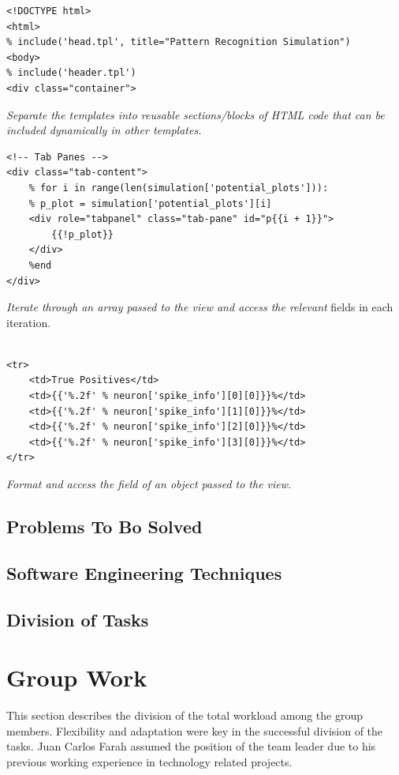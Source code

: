 \documentclass[a4paper,11pt]{article}
\begin{document}
\begin{verbatim}
<!DOCTYPE html>
<html>
% include('head.tpl', title="Pattern Recognition Simulation")
<body>
% include('header.tpl')
<div class="container">
\end{verbatim}
\textit{Separate the templates into reusable sections/blocks of HTML code that can be included dynamically in other templates.}    
\newpage 


\begin{verbatim}
<!-- Tab Panes -->
<div class="tab-content">
    % for i in range(len(simulation['potential_plots'])):
    % p_plot = simulation['potential_plots'][i]
    <div role="tabpanel" class="tab-pane" id="p{{i + 1}}">
        {{!p_plot}}
    </div>
    %end
</div>
\end{verbatim}
\textit{Iterate through an array passed to the view and access the relevant} fields in each iteration.
\\
\\

\begin{verbatim}
<tr>
    <td>True Positives</td>
    <td>{{'%.2f' % neuron['spike_info'][0][0]}}%</td>
    <td>{{'%.2f' % neuron['spike_info'][1][0]}}%</td>
    <td>{{'%.2f' % neuron['spike_info'][2][0]}}%</td>
    <td>{{'%.2f' % neuron['spike_info'][3][0]}}%</td>
</tr>
  \end{verbatim}
\textit{Format and access the field of an object passed to the view.}

\newpage

\subsection{Problems To Bo Solved}

\subsection{Software Engineering Techniques}

\subsection{Division of Tasks}


\clearpage
\section{Group Work}

This section describes the division of the total workload among the group members. Flexibility and adaptation were key in the successful division of the tasks. Juan Carlos Farah assumed the position of the team leader due to his previous working experience in technology related projects.
\end{document}
